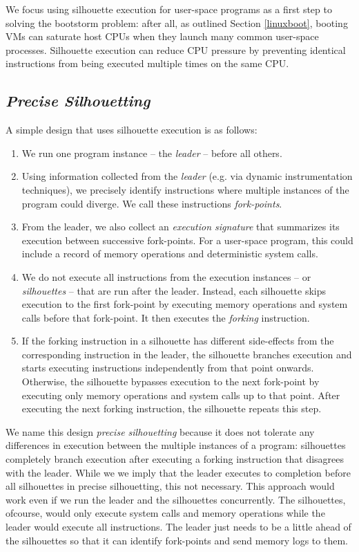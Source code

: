 We focus using silhouette execution for user-space programs as 
a first step to solving the bootstorm problem: after all, as outlined
Section \ref{linuxboot}, booting VMs
can saturate host CPUs when they launch many
common user-space processes. Silhouette
execution can reduce
CPU pressure by preventing
identical instructions from being
executed multiple times on the same CPU.


\subsection{{\em Precise Silhouetting}}\label{precisesil}
A simple design that uses silhouette execution is as follows:

\begin{enumerate}
\item We run one program instance -- the {\em leader} -- before 
all others.
\item Using information collected from the {\em leader} (e.g.
via dynamic instrumentation techniques), 
we precisely identify instructions where
multiple instances of the program could diverge.
We call these instructions {\em fork-points}.
\item From the leader, we also collect an {\em execution signature} 
that summarizes its execution between successive
fork-points. For a user-space program, this could
include a record of memory operations and 
deterministic system calls.
\item We do not execute all instructions from the execution
instances -- or {\em silhouettes} -- that are run
after the leader. Instead, each silhouette skips execution to
the first fork-point by executing memory
operations and system calls before that fork-point. 
It then executes the {\em forking} instruction.
\item If the forking instruction
in a silhouette has different side-effects from
the corresponding instruction in the leader, 
the silhouette branches execution and starts
executing instructions independently
from that point onwards. 
Otherwise, the silhouette bypasses
execution to the next fork-point by
executing only memory operations and
system calls up to that point.
After executing the next forking instruction,
the silhouette repeats this step.
\end{enumerate}

We name this design {\em precise silhouetting} because
it does not tolerate any differences in execution
between the multiple instances of a program:
silhouettes completely branch
execution after executing a
forking instruction that disagrees
with the leader. While we
we imply that the leader
executes to completion before
all silhouettes in precise silhouetting, this not necessary.
This approach would work even
if we run the leader and the silhouettes
concurrently. The silhouettes,
ofcourse, would only execute system calls and memory
operations while
the leader would execute all instructions. 
The leader just needs to be a little
ahead of the silhouettes
so that it can identify fork-points
and send memory logs to them.

